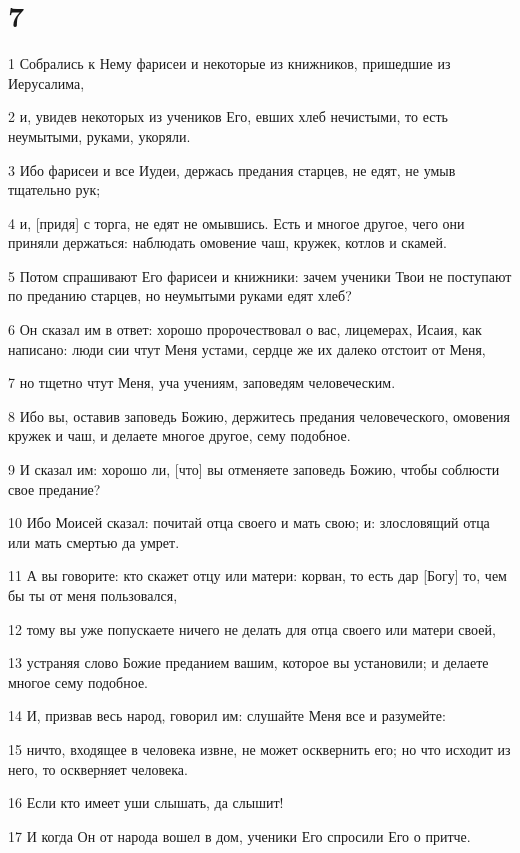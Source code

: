 \chapter{7}

\par 1 Собрались к Нему фарисеи и некоторые из книжников, пришедшие из Иерусалима,
\par 2 и, увидев некоторых из учеников Его, евших хлеб нечистыми, то есть неумытыми, руками, укоряли.
\par 3 Ибо фарисеи и все Иудеи, держась предания старцев, не едят, не умыв тщательно рук;
\par 4 и, [придя] с торга, не едят не омывшись. Есть и многое другое, чего они приняли держаться: наблюдать омовение чаш, кружек, котлов и скамей.
\par 5 Потом спрашивают Его фарисеи и книжники: зачем ученики Твои не поступают по преданию старцев, но неумытыми руками едят хлеб?
\par 6 Он сказал им в ответ: хорошо пророчествовал о вас, лицемерах, Исаия, как написано: люди сии чтут Меня устами, сердце же их далеко отстоит от Меня,
\par 7 но тщетно чтут Меня, уча учениям, заповедям человеческим.
\par 8 Ибо вы, оставив заповедь Божию, держитесь предания человеческого, омовения кружек и чаш, и делаете многое другое, сему подобное.
\par 9 И сказал им: хорошо ли, [что] вы отменяете заповедь Божию, чтобы соблюсти свое предание?
\par 10 Ибо Моисей сказал: почитай отца своего и мать свою; и: злословящий отца или мать смертью да умрет.
\par 11 А вы говорите: кто скажет отцу или матери: корван, то есть дар [Богу] то, чем бы ты от меня пользовался,
\par 12 тому вы уже попускаете ничего не делать для отца своего или матери своей,
\par 13 устраняя слово Божие преданием вашим, которое вы установили; и делаете многое сему подобное.
\par 14 И, призвав весь народ, говорил им: слушайте Меня все и разумейте:
\par 15 ничто, входящее в человека извне, не может осквернить его; но что исходит из него, то оскверняет человека.
\par 16 Если кто имеет уши слышать, да слышит!
\par 17 И когда Он от народа вошел в дом, ученики Его спросили Его о притче.

